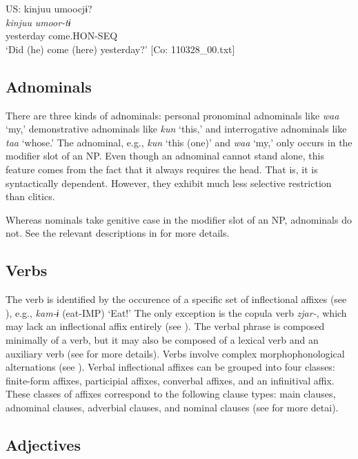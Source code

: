 \ea{} \label{ex:4.48}
US: \glll   kinjuu  umoocjɨ?\\
    \textit{kinjuu}  \textit{umoor-tɨ}\\
    yesterday  come.HON-SEQ\\
  \glt     ‘Did (he) come (here) yesterday?’ [Co: 110328\_00.txt]
\z

\subsection{Adnominals}\label{sec:4.3.2}

There are three kinds of adnominals: personal pronominal adnominals like \textit{waa} ‘my,’ demonstrative adnominals like \textit{kun} ‘this,’ and interrogative adnominals like \textit{taa} ‘whose.’ The adnominal, e.g., \textit{kun} ‘this (one)’ and \textit{waa} ‘my,’ only occurs in the modifier slot of an NP. Even though an adnominal cannot stand alone, this feature comes from the fact that it always requires the head. That is, it is syntactically dependent. However, they exhibit much less selective restriction than clitics. 

Whereas nominals take genitive case in the modifier slot of an NP, adnominals do not. See the relevant descriptions in  for more details.

\subsection{Verbs}\label{sec:4.3.3}

The verb is identified by the occurence of a specific set of inflectional affixes (see ), e.g., \textit{kam-ɨ} (eat-IMP) ‘Eat!’ The only exception is the copula verb \textit{zjar-}, which may lack an inflectional affix entirely (see ). The verbal phrase is composed minimally of a verb, but it may also be composed of a lexical verb and an auxiliary verb (see  for more details). Verbs involve complex morphophonological alternations (see ). Verbal inflectional affixes can be grouped into four classes: finite-form affixes, participial affixes, converbal affixes, and an infinitival affix. These classes of affixes correspond to the following clause types: main clauses, adnominal clauses, adverbial clauses, and nominal clauses (see  for more detai).

\subsection{Adjectives}\label{sec:4.3.4}


